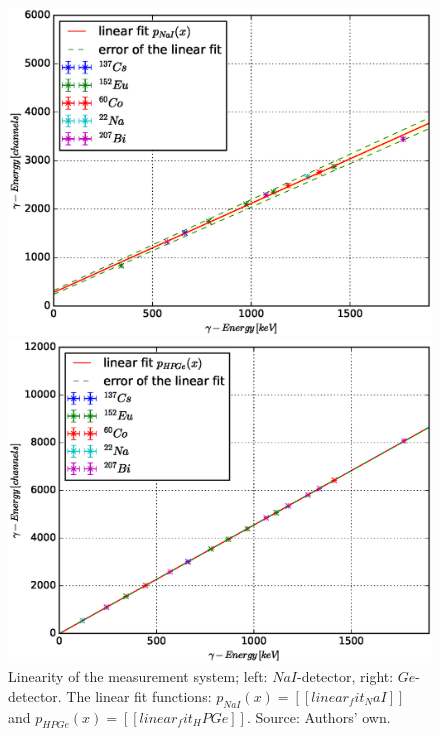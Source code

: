 \documentclass[a4paper]{article}
\begin{document}
\begin{figure}[H]
	\begin{minipage}[t]{0.5\textwidth}
		\begin{center}
		\includegraphics[width=1.0\textwidth]{plots/system_linearity_NaI.eps}
		\end{center}
	\end{minipage}
	\begin{minipage}[t]{0.5\textwidth}
		\begin{center}
		\includegraphics[width=1.0\textwidth]{plots/system_linearity_HPGe.eps}
		\end{center}
	\end{minipage}
	\caption{Linearity of the measurement system; left: $NaI$-detector, right: $Ge$-detector. The linear fit functions: $p_{NaI}(x) = [[linear_fit_NaI]]$ and $p_{HPGe}(x) = [[linear_fit_HPGe]]$. Source: Authors' own.}
	\label{fig:system_linearity}
\end{figure}
\end{document}
